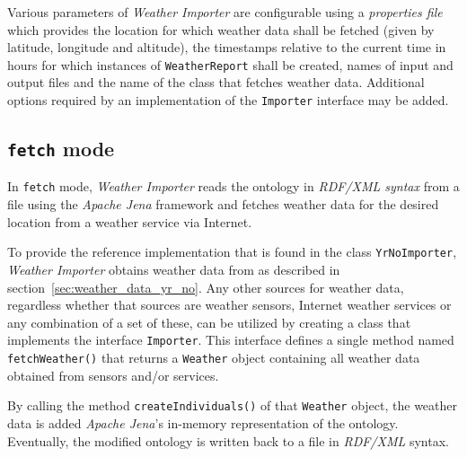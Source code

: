 Various parameters of \emph{Weather Importer} are configurable using a \emph{properties file}~\cite{java_properties} which provides the location for which weather data shall be fetched (given by latitude, longitude and altitude), the timestamps relative to the current time in hours for which instances of \texttt{WeatherReport} shall be created, names of input and output files and the name of the class that fetches weather data. Additional options required by an implementation of the \texttt{Importer} interface may be added.

\subsection{\texttt{fetch} mode}
\label{subsec:importer_fetch}

In \texttt{fetch} mode, \emph{Weather Importer} reads the \smarthomeweather ontology in \emph{RDF/XML syntax} from a file using the \emph{Apache Jena} framework and fetches weather data for the desired location from a weather service via Internet.

To provide the reference implementation that is found in the class \texttt{YrNoImporter}, \emph{Weather Importer} obtains weather data from \yrno as described in section~\ref{sec:weather_data_yr_no}. Any other sources for weather data, regardless whether that sources are weather sensors, Internet weather services or any combination of a set of these, can be utilized by creating a class that implements the interface \texttt{Importer}. This interface defines a single method named \texttt{fetchWeather()} that returns a \texttt{Weather} object containing all weather data obtained from sensors and/or services.

By calling the method \texttt{createIndividuals()} of that \texttt{Weather} object, the weather data is added \emph{Apache Jena}'s in-memory representation of the ontology. Eventually, the modified ontology is written back to a file in \emph{RDF/XML} syntax.

